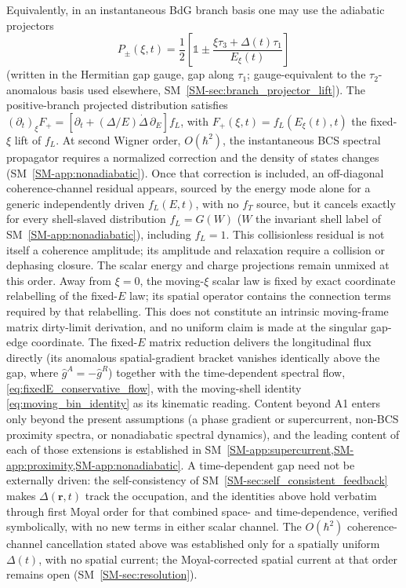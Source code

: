 \documentclass[
  aps,
  prb,
  preprint,
  superscriptaddress,
  longbibliography,
  nofootinbib
]{revtex4-2}
\newcommand{\br}{\mathbf{r}}
\newcommand{\fL}{f_L}
\newcommand{\fT}{f_T}
\providecommand{\openone}{}\renewcommand{\openone}{\mathds{1}}
\begin{document}
Equivalently, in an instantaneous BdG branch basis one may use the adiabatic
projectors
\begin{equation}
  P_\pm(\xi,t)=
  \frac{1}{2}
  \left[
    \openone
    \pm
    \frac{\xi\tau_3+\Delta(t)\tau_1}{E_\xi(t)}
  \right]
  \label{eq:branch_projector_main}
\end{equation}
(written in the Hermitian gap gauge, gap along \(\tau_1\);
gauge-equivalent to the \(\tau_2\)-anomalous basis used elsewhere,
SM~\cref{SM-sec:branch_projector_lift}).
The positive-branch projected distribution satisfies
\((\partial_t)_{\xi}F_+
=[\partial_t+(\Delta/E)\dot\Delta\,\partial_E]\fL\), with
\(F_+(\xi,t)=\fL(E_\xi(t),t)\) the fixed-\(\xi\) lift of \(\fL\).
At second Wigner order, \(O(\hbar^2)\), the instantaneous BCS spectral
propagator requires a normalized correction and the density of states changes
(SM~\cref{SM-app:nonadiabatic}). Once that correction is included, an
off-diagonal coherence-channel residual appears, sourced by the energy mode
alone for a generic independently driven \(\fL(E,t)\), with no \(\fT\)
source, but it cancels exactly for every shell-slaved distribution
\(\fL=G(W)\) (\(W\) the invariant shell label of
SM~\cref{SM-app:nonadiabatic}), including \(\fL=1\). This collisionless residual is not itself a coherence amplitude;
its amplitude and relaxation require a collision or dephasing closure. The
scalar energy and charge projections remain unmixed at this order. Away from
\(\xi=0\), the moving-\(\xi\) scalar law is fixed by exact
coordinate relabelling of the fixed-\(E\) law; its spatial operator contains
the connection terms required by that relabelling. This does not constitute
an intrinsic moving-frame matrix dirty-limit derivation, and no uniform claim
is made at the singular gap-edge coordinate. The fixed-\(E\) matrix reduction
delivers the longitudinal flux directly (its anomalous spatial-gradient
bracket vanishes identically above the gap, where
\(\hat g^A=-\hat g^R\)) together with the time-dependent spectral flow,
\cref{eq:fixedE_conservative_flow}, with the moving-shell identity
\cref{eq:moving_bin_identity} as its kinematic reading. Content
beyond A1 enters only beyond the present assumptions (a phase gradient or supercurrent, non-BCS
proximity spectra, or nonadiabatic spectral dynamics), and the leading content
of each of those extensions is established in
SM~\cref{SM-app:supercurrent,SM-app:proximity,SM-app:nonadiabatic}.
A time-dependent gap need not be externally driven: the self-consistency
of SM~\cref{SM-sec:self_consistent_feedback} makes \(\Delta(\br,t)\) track the
occupation, and the identities above hold verbatim through first Moyal
order for that combined space- and time-dependence, verified
symbolically, with no new terms in either scalar channel. The
\(O(\hbar^2)\) coherence-channel cancellation stated above was
established only for a spatially uniform \(\Delta(t)\), with no spatial
current; the Moyal-corrected spatial current at that order remains open
(SM~\cref{SM-sec:resolution}).
\end{document}
